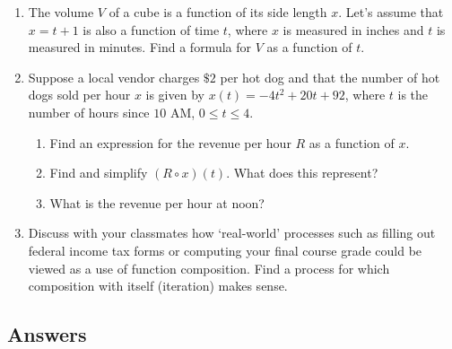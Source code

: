 \begin{enumerate}
\setcounter{enumi}{\value{HW}}


\item The volume $V$ of a cube is a function of its side length $x$.  Let's assume that $x = t + 1$ is also a function of time $t$, where $x$ is measured in inches and $t$ is measured in minutes.  Find a formula for $V$ as a function of $t$.

\item  Suppose a local vendor charges $\$2$ per hot dog and that the number of hot dogs sold per hour $x$ is given by $x(t) = -4t^2+20t+92$, where $t$ is the number of hours since $10$ AM, $0 \leq t \leq 4$.

\begin{enumerate}

\item  Find an expression for the revenue per hour $R$ as a function of $x$.
\item  Find and simplify $\left(R \circ x\right)(t)$.  What does this represent?
\item  What is the revenue per hour at noon?

\end{enumerate}

\item Discuss with your classmates how `real-world' processes such as filling out federal income tax forms or computing your final course grade could be viewed as a use of function composition.  Find a process for which composition with itself (iteration) makes sense.

\end{enumerate}

\newpage

\subsection{Answers}


